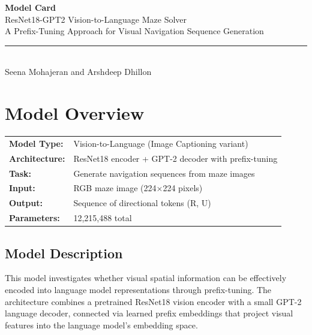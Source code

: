 \documentclass[11pt,a4paper]{article}
\begin{document}
\begin{center}
    {\Huge\bfseries\color{sectionblue} Model Card}\\[0.5cm]
    {\LARGE ResNet18-GPT2 Vision-to-Language Maze Solver}\\[0.3cm]
    {\large A Prefix-Tuning Approach for Visual Navigation Sequence Generation}\\[0.5cm]
    \rule{\textwidth}{1pt}\\[0.3cm]
    {\large Seena Mohajeran and Arshdeep Dhillon}
\end{center}

\vspace{0.5cm}

\section{Model Overview}

\begin{infobox}
\begin{tabular}{@{}ll}
\textbf{Model Type:} & Vision-to-Language (Image Captioning variant) \\
\textbf{Architecture:} & ResNet18 encoder + GPT-2 decoder with prefix-tuning \\
\textbf{Task:} & Generate navigation sequences from maze images \\
\textbf{Input:} & RGB maze image (224$\times$224 pixels) \\
\textbf{Output:} & Sequence of directional tokens (R, U) \\
\textbf{Parameters:} & 12,215,488 total \\
\end{tabular}
\end{infobox}

\subsection{Model Description}

This model investigates whether visual spatial information can be effectively encoded into language model representations through prefix-tuning. The architecture combines a pretrained ResNet18 vision encoder with a small GPT-2 language decoder, connected via learned prefix embeddings that project visual features into the language model's embedding space.
\end{document}
